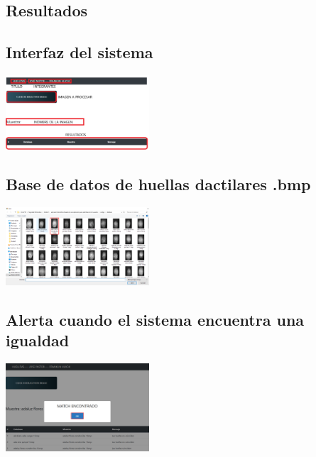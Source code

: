 \documentclass[preprint,12pt]{elsarticle}
\begin{document}
\begin{multicols}{2}

\section{Resultados}
	\subsection{Interfaz del sistema}
	{\includegraphics[width=0.4\textwidth]{./IMAGENES/interfaz}\par}
	\subsection{Base de datos de huellas dactilares .bmp}
	{\includegraphics[width=0.4\textwidth]{./IMAGENES/huellas}\par}
	\subsection{Alerta cuando el sistema encuentra una igualdad}
	{\includegraphics[width=0.4\textwidth]{./IMAGENES/match}\par}







\end{multicols}
\end{document}
